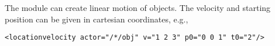 The  module can create linear motion of
objects. The velocity  and starting position  can be
given in cartesian coordinates, e.g.,
\begin{lstlisting}[numbers=none]
<locationvelocity actor="/*/obj" v="1 2 3" p0="0 0 1" t0="2"/>
\end{lstlisting}


